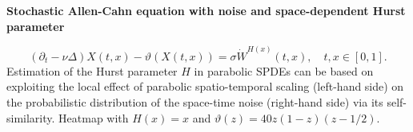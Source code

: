{\myfontsize \linespread{0.7}
\begin{center}
\textbf{Stochastic Allen-Cahn equation with noise and space-dependent Hurst parameter}
\end{center}
\begin{equation*}
\left(\partial_t  - \nu \Delta\right) X(t,x) - \vartheta(X(t,x)) = \sigma \dot{W}^{H(x)}(t,x), \quad t,x \in [0,1].
\end{equation*}
Estimation of the Hurst parameter $H$ in parabolic SPDEs can be based on exploiting the local effect of parabolic spatio-temporal scaling (left-hand side) on the probabilistic distribution of the space-time noise (right-hand side) via its self-similarity. Heatmap with $H(x) = x$ and $\vartheta(z)=40 z (1-z)(z-1/2)$.\\ \par}{
\fontsize{12}{4}
\par
}